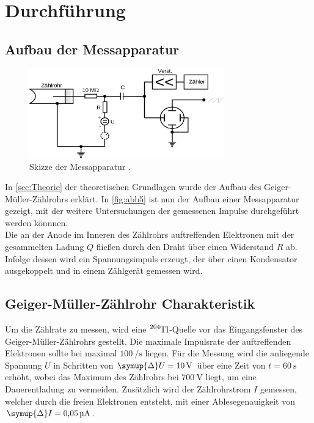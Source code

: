 \section{Durchführung} \label{sec:Durchführung}

\subsection{Aufbau der Messapparatur}

    \begin{figure}
      \centering
      \includegraphics[width=0.75\textwidth]{content/img/V703_Abb5.jpg}
      \caption{Skizze der Messapparatur \cite{versuchsanleitung}.}
      \label{fig:abb5}
    \end{figure}

    In \autoref{sec:Theorie} der theoretischen Grundlagen wurde der Aufbau des Geiger-Müller-Zählrohrs erklärt.
    In \autoref{fig:abb5} ist nun der Aufbau einer Messapparatur gezeigt,
    mit der weitere Untersuchungen der gemessenen Impulse durchgeführt werden könnnen. \\
    Die an der Anode im Inneren des Zählrohrs auftreffenden Elektronen mit der gesammelten
    Ladung $Q$ fließen durch den Draht über einen Widerstand $R$ ab.
    Infolge dessen wird ein Spannungsimpuls erzeugt,
    der über einen Kondensator ausgekoppelt und in einem Zählgerät gemessen wird.

\subsection{Geiger-Müller-Zählrohr Charakteristik} \label{sec:charaktbestimmen}

    Um die Zählrate zu messen, wird eine $\ce{^204Tl}$-Quelle vor das Eingangsfenster
    des Geiger-Müller-Zählrohrs gestellt. Die maximale Impulsrate der auftreffenden
    Elektronen sollte bei maximal $\SI{100}{\per\second}$ liegen.
    Für die Messung wird die anliegende Spannung $U$ in Schritten von $\symup{\Delta}U = \SI{10}{\volt}$
    über eine Zeit von $t = \SI{60}{\second}$ erhöht,
    wobei das Maximum des Zählrohrs bei $\SI{700}{\volt}$ liegt, um eine Dauerentladung
    zu vermeiden.
    Zusätzlich wird der Zählrohrstrom $I$ gemessen, welcher durch die freien Elektronen
    entsteht, mit einer Ablesegenauigkeit von $\symup{\Delta}I = \SI{0.05}{\micro\ampere}$.


